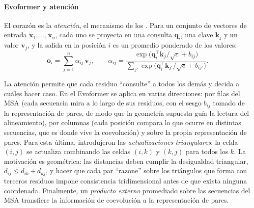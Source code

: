 \paragraph{Evoformer y atención} El corazón es la \emph{atención}, el mecanismo de los . Para un conjunto de vectores de entrada $\mathbf x_1,\dots,\mathbf x_n$, cada uno se proyecta en una consulta $\mathbf q_i$, una clave $\mathbf k_j$ y un valor $\mathbf v_j$, y la salida en la posición $i$ es un promedio ponderado de los valores:
\begin{equation}\label{eq:15-atencion}
\mathbf o_i=\sum_{j=1}^{n}\alpha_{ij}\,\mathbf v_j,\qquad
\alpha_{ij}=\frac{\exp\!\big(\mathbf q_i^\top\mathbf k_j/\sqrt{c}+b_{ij}\big)}{\sum_{j'}\exp\!\big(\mathbf q_i^\top\mathbf k_{j'}/\sqrt{c}+b_{ij'}\big)}.
\end{equation}

\begin{simbolos}
\end{simbolos}

La atención permite que cada residuo ``consulte'' a todos los demás y decida a cuáles hacer caso. En el Evoformer se aplica en varias direcciones: por filas del MSA (cada secuencia mira a lo largo de sus residuos, con el sesgo $b_{ij}$ tomado de la representación de pares, de modo que la geometría supuesta guía la lectura del alineamiento), por columnas (cada posición compara lo que ocurre en distintas secuencias, que es donde vive la coevolución) y sobre la propia representación de pares. Para esta última, \textcite{c15-jumper2021} introdujeron las \emph{actualizaciones triangulares}: la celda $(i,j)$ se actualiza combinando las celdas $(i,k)$ y $(k,j)$ para todos los $k$. La motivación es geométrica: las distancias deben cumplir la desigualdad triangular, $d_{ij}\le d_{ik}+d_{kj}$, y hacer que cada par ``razone'' sobre los triángulos que forma con terceros residuos impone consistencia tridimensional antes de que exista ninguna coordenada. Finalmente, un \emph{producto externo} promediado sobre las secuencias del MSA transfiere la información de coevolución a la representación de pares.

